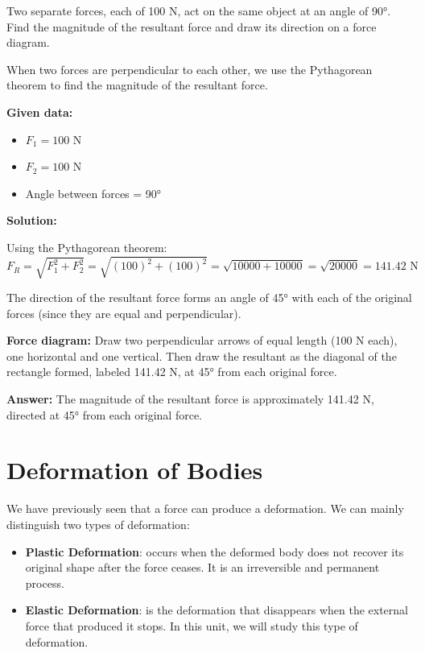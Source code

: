 \begin{exercise}
    Two separate forces, each of 100 N, act on the same object at an angle of \ang{90}.
    Find the magnitude of the resultant force and draw its direction on a force diagram.

    \begin{solu}
        When two forces are perpendicular to each other, we use the Pythagorean theorem to find the magnitude of the resultant force.

        \textbf{Given data:}
        \begin{itemize}
            \item $F_1 = 100$ N
            \item $F_2 = 100$ N
            \item Angle between forces = 90°
        \end{itemize}

        \textbf{Solution:}

        Using the Pythagorean theorem:
        $$F_R = \sqrt{F_1^2 + F_2^2} = \sqrt{(100)^2 + (100)^2} = \sqrt{10000 + 10000} = \sqrt{20000} = 141.42\text{ N}$$

        The direction of the resultant force forms an angle of 45° with each of the original forces (since they are equal and perpendicular).

        \textbf{Force diagram:} Draw two perpendicular arrows of equal length (100 N each), one horizontal and one vertical. Then draw the resultant as the diagonal of the rectangle formed, labeled 141.42 N, at 45° from each original force.

        \textbf{Answer:} The magnitude of the resultant force is approximately 141.42 N, directed at 45° from each original force.
    \end{solu}
\end{exercise}


\section{Deformation of Bodies}


We have previously seen that a force can produce a deformation.
We can mainly distinguish two types of deformation:

\begin{itemize}
    \item \textbf{Plastic Deformation}: occurs when the deformed body does not recover its original shape after the force ceases.
    It is an irreversible and permanent process.
    \item \textbf{Elastic Deformation}: is the deformation that disappears when the external force that produced it stops.
    In this unit, we will study this type of deformation.
\end{itemize}

